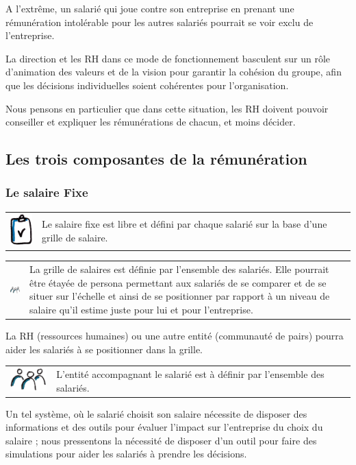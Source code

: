 \documentclass[12pt]{article}
\newcommand{\assemblee}[1]{%
  \begin{tcolorbox}[colframe=DarkPlum,boxrule=2pt,arc=4pt,left=6pt,right=6pt,top=6pt,bottom=6pt,boxsep=0pt,colback=white]
    \begin{tabular}{m{1.5cm} m{11cm}}
      \includegraphics[width=1.5cm]{includes/team} & #1 \\
    \end{tabular}
  \end{tcolorbox}
}
\newcommand{\regle}[1]{%
  \begin{tcolorbox}[colframe=DarkOrange,boxrule=2pt,arc=4pt,left=6pt,right=6pt,top=6pt,bottom=6pt,boxsep=0pt,colback=LightOrange]
    \begin{tabular}{m{1.0cm} m{11.5cm}}
      \includegraphics[width=1.0cm]{includes/rules} & #1 \\
    \end{tabular}
  \end{tcolorbox}
}
\begin{document}
 A l'extrême, un salarié qui joue contre son entreprise en prenant une rémunération intolérable pour les autres salariés pourrait se voir exclu de l’entreprise. 

 La direction et les RH dans ce mode de fonctionnement basculent sur un rôle d’animation des valeurs et de la vision pour garantir la cohésion du groupe, afin que les décisions individuelles soient cohérentes pour l’organisation. 
 
 Nous pensons en particulier que dans cette situation, les RH doivent pouvoir conseiller et expliquer les rémunérations de chacun, et moins décider.

\subsection{Les trois composantes de la rémunération}
\subsubsection{Le salaire Fixe}

 \regle{Le salaire fixe est libre et défini par chaque salarié sur la base d’une grille de salaire. }

 \assemblee{La grille de salaires est définie par l’ensemble des salariés. Elle pourrait être étayée de persona permettant aux salariés de se comparer et de se situer sur l’échelle et ainsi de se positionner par rapport à un niveau de salaire qu’il estime juste pour lui et pour l’entreprise.}

 La RH (ressources humaines) ou une autre entité (communauté de pairs) pourra aider les salariés à se positionner dans la grille. 
 
 \assemblee{L'entité accompagnant le salarié est à définir par l'ensemble des salariés.}
 
 Un tel système, où le salarié choisit son salaire nécessite de disposer des informations et des outils pour évaluer l’impact sur l’entreprise du choix du salaire ; nous pressentons la nécessité de disposer d’un outil pour faire des simulations pour aider les salariés à prendre les décisions.
 
\end{document}
